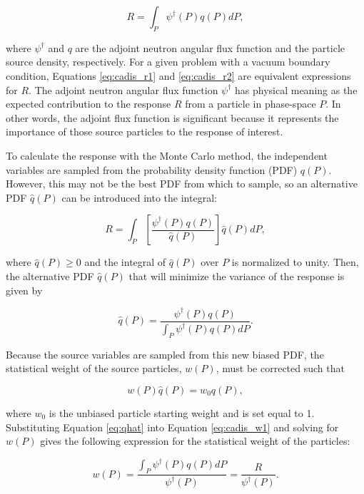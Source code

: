 \documentclass{article} %
\newcommand{\qhat}{\ensuremath{\hat{q}}}
\begin{document}
\begin{equation}
R = \int_P \psi^{\dagger}(P)q(P)dP,
\label{eq:cadis_r2}
\end{equation}

\noindent where $\psi^{\dagger}$ and $q$ are the adjoint neutron angular flux
function and the particle source density, respectively. For a given problem
with a vacuum boundary condition, Equations \ref{eq:cadis_r1} and
\ref{eq:cadis_r2} are equivalent expressions for $R$. The adjoint neutron
angular flux function $\psi^{\dagger}$ has physical meaning as the expected
contribution to the response $R$ from a particle in phase-space $P$. In other
words, the adjoint flux function is significant because it represents the
importance of those source particles to the response of interest.

To calculate the response with the Monte Carlo method, the independent
variables are sampled from the probability density function (PDF) $q(P)$.
However, this may not be the best PDF from which to sample, so an alternative
PDF $\qhat(P)$ can be introduced into the integral:

\begin{equation}
R = \int_P \left[\frac{\psi^{\dagger}(P)q(P)}{\qhat(P)}\right]\qhat(P)dP,
\end{equation}

\noindent where $\qhat(P) \geq 0$ and the integral of $\qhat(P)$ over $P$ is 
normalized to unity. Then, the alternative PDF $\qhat(P)$ that will minimize
the variance of the response is given by

\begin{equation}
\qhat(P) = \frac{\psi^{\dagger}(P)q(P)}{\int_P\psi^{\dagger}(P)q(P)dP}.
\label{eq:qhat}
\end{equation}

Because the source variables are sampled from this new biased PDF, the
statistical weight of the source particles, $w(P)$, must be corrected such that

\begin{equation}
w(P)\qhat(P) = w_0q(P),
\label{eq:cadis_w1}
\end{equation}

\noindent where $w_0$ is the unbiased particle starting weight and is set equal
to 1. Substituting Equation \ref{eq:qhat} into Equation \ref{eq:cadis_w1} and
solving for $w(P)$ gives the following expression for the statistical weight of
the particles:

\begin{equation}
w(P) = \frac{\int_P\psi^{\dagger}(P)q(P)dP}{\psi^{\dagger}(P)}
= \frac{R}{\psi^{\dagger}(P)}.
\label{eq:cadis_w2}
\end{equation}
\end{document}
